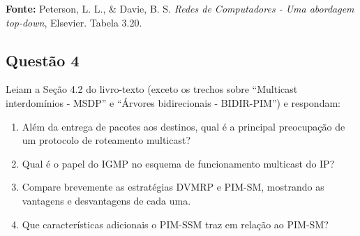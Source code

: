 \textbf{Fonte:} Peterson, L. L., \& Davie, B. S. \textit{Redes de Computadores - Uma abordagem top-down}, Elsevier. Tabela 3.20.

\subsection{Questão 4}
Leiam a Seção 4.2 do livro-texto (exceto os trechos sobre “Multicast
interdomínios - MSDP” e “Árvores bidirecionais - BIDIR-PIM”) e respondam:

\begin{enumerate}[label=\alph*.]
    \item Além da entrega de pacotes aos destinos, qual é a principal preocupação de um
    protocolo de roteamento multicast?
    \item Qual é o papel do IGMP no esquema de funcionamento multicast do IP?
    \item Compare brevemente as estratégias DVMRP e PIM-SM, mostrando as vantagens e
    desvantagens de cada uma.
    \item Que características adicionais o PIM-SSM traz em relação ao PIM-SM?
\end{enumerate}

